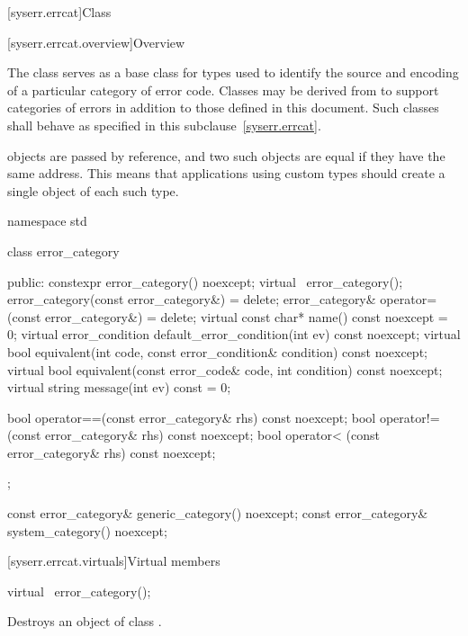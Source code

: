 [syserr.errcat]{Class }

[syserr.errcat.overview]{Overview}

\pnum
The class  serves as a base class for types used
to identify the source and encoding of a particular category of error code.
Classes may be derived from  to support
categories of errors in addition to those defined in this document.
Such classes shall behave as specified in this
subclause~\ref{syserr.errcat}. \begin{note}  objects are
passed by reference, and two such objects
are equal if they have the same address. This means that applications using
custom  types should create a single object of each
such type. \end{note}

%
%
%
\begin{codeblock}
namespace std {
  class error_category {
  public:
    constexpr error_category() noexcept;
    virtual ~error_category();
    error_category(const error_category&) = delete;
    error_category& operator=(const error_category&) = delete;
    virtual const char* name() const noexcept = 0;
    virtual error_condition default_error_condition(int ev) const noexcept;
    virtual bool equivalent(int code, const error_condition& condition) const noexcept;
    virtual bool equivalent(const error_code& code, int condition) const noexcept;
    virtual string message(int ev) const = 0;

    bool operator==(const error_category& rhs) const noexcept;
    bool operator!=(const error_category& rhs) const noexcept;
    bool operator< (const error_category& rhs) const noexcept;
  };

  const error_category& generic_category() noexcept;
  const error_category& system_category() noexcept;
}
\end{codeblock}

[syserr.errcat.virtuals]{Virtual members}

%
\begin{itemdecl}
virtual ~error_category();
\end{itemdecl}

\begin{itemdescr}
\pnum
\effects Destroys an object of class .
\end{itemdescr}

